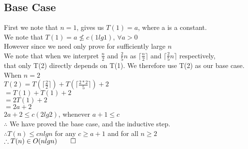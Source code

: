 \documentclass{article}
\begin{document}
      \subsection{Base Case}
        First we note that $n = 1$, gives us $T(1) = a$, where a is a constant. \\
        We note that $T(1) = a \not\leq c(1lg1)$, $\forall a > 0$ \\
        However since we need only prove for sufficiently large $n$ \\
        We note that when we interpret $\frac{n}{2}$ and $\frac{2}{5}n$ as $\lceil\frac{n}{2}\rceil$ and $\lceil\frac{2}{5}n\rceil$ respectively, \\
        that only T(2) directly depends on T(1). We therefore use T(2) as our base case.
        When $n = 2$ \\
        $T(2) = T(\lceil\frac{2}{2}\rceil) + T(\lceil\frac{2*2}{5}\rceil) + 2$ \\
        $= T(1) + T(1) + 2$ \\
        $= 2T(1) + 2$ \\
        $= 2a + 2$ \\
        $2a + 2 \leq c(2lg2)$, whenever $a + 1 \leq c$ \\
        $\therefore$ We have proved the base case, and the inductive step. \\
        $\therefore T(n) \leq cnlgn$  for any $c \geq a + 1$ and for all $n \geq 2$\\
        $\therefore T(n) \in O(nlgn) \qed$
	
\end{document}

